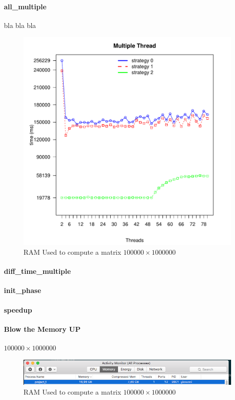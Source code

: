 \documentclass[]{article}
\begin{document}
\paragraph{all\_multiple}
bla bla bla
\begin{figure}[H]
	\centering
	\includegraphics[width=1\textwidth]{img/all_multiple.pdf}
	\caption
	{RAM Used to compute a matrix $100000\times1000000$}
	\label{fig:all_multiple}
\end{figure}



\paragraph{diff\_time\_multiple}

\paragraph{init\_phase}

\paragraph{speedup}


\paragraph{Blow the Memory UP}
$100000\times1000000$
\begin{figure}[h!]
	\centering
	\includegraphics[width=1.15\textwidth]{img/memory_used.png}
	\caption
	{RAM Used to compute a matrix $100000\times1000000$}
	\label{fig:memory_blowed_up}
\end{figure}
\end{document}
